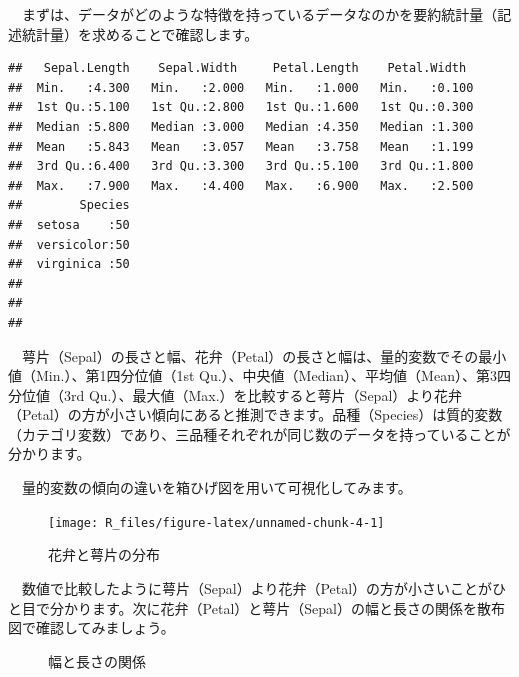 \documentclass[
  12pt,
]{book}
\begin{document}
\newpage

　まずは、データがどのような特徴を持っているデータなのかを要約統計量（記述統計量）を求めることで確認します。

\begin{verbatim}
##   Sepal.Length    Sepal.Width     Petal.Length    Petal.Width   
##  Min.   :4.300   Min.   :2.000   Min.   :1.000   Min.   :0.100  
##  1st Qu.:5.100   1st Qu.:2.800   1st Qu.:1.600   1st Qu.:0.300  
##  Median :5.800   Median :3.000   Median :4.350   Median :1.300  
##  Mean   :5.843   Mean   :3.057   Mean   :3.758   Mean   :1.199  
##  3rd Qu.:6.400   3rd Qu.:3.300   3rd Qu.:5.100   3rd Qu.:1.800  
##  Max.   :7.900   Max.   :4.400   Max.   :6.900   Max.   :2.500  
##        Species  
##  setosa    :50  
##  versicolor:50  
##  virginica :50  
##                 
##                 
## 
\end{verbatim}

　萼片（Sepal）の長さと幅、花弁（Petal）の長さと幅は、量的変数でその最小値（Min.）、第1四分位値（1st Qu.）、中央値（Median）、平均値（Mean）、第3四分位値（3rd Qu.）、最大値（Max.）を比較すると萼片（Sepal）より花弁（Petal）の方が小さい傾向にあると推測できます。品種（Species）は質的変数（カテゴリ変数）であり、三品種それぞれが同じ数のデータを持っていることが分かります。

　量的変数の傾向の違いを箱ひげ図を用いて可視化してみます。

\begin{figure}[H]

{\centering \texttt{[image: R\_files/figure-latex/unnamed-chunk-4-1]} 

}

\caption{花弁と萼片の分布}\label{fig:unnamed-chunk-4}
\end{figure}

　数値で比較したように萼片（Sepal）より花弁（Petal）の方が小さいことがひと目で分かります。次に花弁（Petal）と萼片（Sepal）の幅と長さの関係を散布図で確認してみましょう。

\begin{figure}[H]

{\centering {}

}

\caption{幅と長さの関係}\label{fig:unnamed-chunk-5}
\end{figure}
\end{document}
